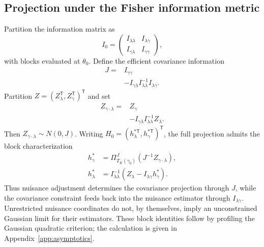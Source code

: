 \subsection{Projection under the Fisher information metric}
\label{subsec:fisher_projection}
Partition the information matrix as
\begin{equation}\label{eq:sec4-information-partition}
I_0=
\begin{pmatrix}
I_{\lambda\lambda}&I_{\lambda\gamma}\\
I_{\gamma\lambda}&I_{\gamma\gamma}
\end{pmatrix},
\end{equation}
with blocks evaluated at $\theta_0$. Define the efficient covariance information
\begin{equation}\label{eq:sec4-efficient-information}
\begin{aligned}
J={}&I_{\gamma\gamma}\\
&-I_{\gamma\lambda}I_{\lambda\lambda}^{-1}
I_{\lambda\gamma}.
\end{aligned}
\end{equation}
Partition $Z=(Z_\lambda^{\mathsf T},Z_\gamma^{\mathsf T})^{\mathsf T}$ and set
\begin{equation}\label{eq:sec4-efficient-score}
\begin{aligned}
Z_{\gamma\cdot\lambda}
={}&Z_\gamma\\
&-I_{\gamma\lambda}I_{\lambda\lambda}^{-1}Z_\lambda.
\end{aligned}
\end{equation}
Then $Z_{\gamma\cdot\lambda}\sim N(0,J)$. Writing $H_0=(h_\lambda^{*\mathsf T},h_\gamma^{*\mathsf T})^{\mathsf T}$, the full projection admits the block characterization
\begin{align}
 h_\gamma^*
 &=\Pi_{T_K(\gamma_0)}^J
 (J^{-1}Z_{\gamma\cdot\lambda}),
 \label{eq:sec4-cov-projection}\\
 h_\lambda^*
 &=I_{\lambda\lambda}^{-1}
 (Z_\lambda-I_{\lambda\gamma}h_\gamma^*).
 \label{eq:sec4-nuisance-projection}
\end{align}
Thus nuisance adjustment determines the covariance projection through $J$, while the covariance constraint feeds back into the nuisance estimator through $I_{\lambda\gamma}$. Unrestricted nuisance coordinates do not, by themselves, imply an unconstrained Gaussian limit for their estimators. These block identities follow by profiling the Gaussian quadratic criterion; the calculation is given in Appendix~\ref{app:asymptotics}.


